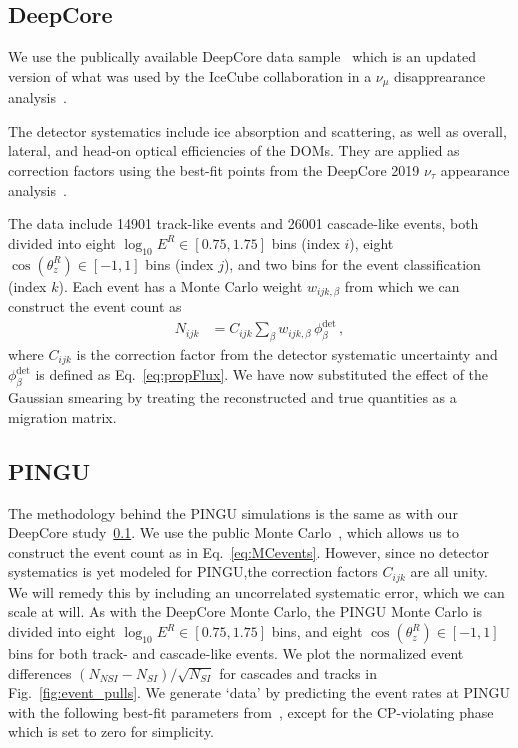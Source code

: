 \documentclass{revtex4-2}
\newcommand{\zreco}{\ensuremath{\cos{(\theta_z^{R})}}}
\newcommand{\Ereco}{E^{R}}
\begin{document}
\subsection{DeepCore}\label{ch:DCmethod} %
We use the publically available DeepCore data sample~\cite{DC2019data} which is an updated version of what was used by the 
IceCube collaboration in a $\nu_\mu$ disapprearance analysis~\cite{DC2018mudisappearance}.

The detector systematics include ice absorption and scattering, as well as overall, lateral, and head-on optical efficiencies of the DOMs. 
They are applied as correction factors using the best-fit points from the DeepCore 2019 $\nu_\tau$ appearance 
analysis~\cite{DC2019tauappearance}.

The data include 14901 track-like events and 26001 cascade-like events, both divided into eight 
$ \log_{10}\Ereco \in [0.75,1.75]$ bins (index $i$), eight $\zreco \in [-1,1]$ bins (index $j$), and two bins for the event classification (index $k$). 
Each event has a Monte Carlo weight $w_{ijk,\beta}$ from which we can construct the event count as
\begin{align}\label{eq:MCevents}
    N_{ijk} &= C_{ijk}\sum_{\beta}w_{ijk,\beta}\, \phi_\beta^\text{det}\,,
\end{align}
where $C_{ijk}$ is the correction factor from the detector systematic uncertainty and $\phi_\beta^\text{det}$ is defined as Eq.~\ref{eq:propFlux}. 
We have now substituted the effect of the Gaussian smearing by treating the reconstructed and true quantities as a migration matrix. 

\subsection{PINGU}\label{ch:PINGUmethod} %
The methodology behind the PINGU simulations is the same as with our DeepCore study~\ref{ch:DCmethod}. We use the public Monte Carlo~\cite{PINGUdata}, 
which allows us to construct the event count as in Eq.~\ref{eq:MCevents}.
However, since no detector systematics is yet modeled for PINGU,the correction factors $C_{ijk}$ are all unity. We will remedy this by including an uncorrelated systematic error,
which we can scale at will.
As with the DeepCore Monte Carlo, the PINGU Monte Carlo is divided into eight 
$\log_{10}\Ereco \in [0.75,1.75]$ bins, and eight $\zreco \in [-1,1]$ bins for both track- and cascade-like events. 
We plot the normalized event differences $(N_{NSI} - N_{SI})/\sqrt{N_{SI}}$ for cascades and tracks in Fig.~\ref{fig:event_pulls}.
We generate `data' by predicting the event rates at PINGU with the following best-fit parameters from~\cite{nufit}, except for the CP-violating phase which is set to zero for simplicity.
\end{document}
